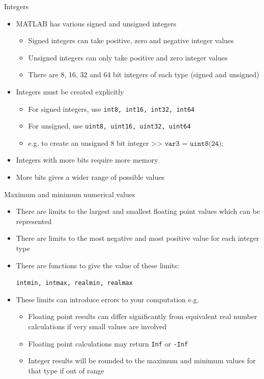 \documentclass{beamer}
\begin{document}
\begin{frame}{Integers}
	\begin{itemize}
		\item MATLAB has various signed and unsigned integers
		\begin{itemize}
			\item Signed integers can take positive, zero and negative integer values
			\item Unsigned integers can only take positive and zero integer values
			\item There are 8, 16, 32 and 64 bit integers of each type (signed and unsigned)
		\end{itemize}
		\item Integers must be created explicitly
		\begin{itemize}
			\item For signed integers, use \texttt{int8, int16, int32, int64}
			\item For unsigned, use \texttt{uint8, uint16, uint32, uint64}
			\item e.g. to create an unsigned 8 bit integer
				$\texttt{>> var3 = uint8(24);}$
		\end{itemize}
		
		\item Integers with more bits require more memory
		\item More bits gives a wider range of possible values
	\end{itemize}
\end{frame}

\begin{frame}{Maximum and minimum numerical values}
	\begin{itemize}
		\item There are limits to the largest and smallest floating point values which can be represented
		\item There are limits to the most negative and most positive value for each integer type
		\item There are functions to give the value of these limits:
		
		\texttt{intmin, intmax, realmin, realmax}
		\item These limits can introduce errors to your computation e.g.
		
		\begin{itemize}
			\item Floating point results can differ significantly from equivalent real number calculations if very small values are involved
			\item Floating point calculations may return \texttt{Inf} or \texttt{-Inf}
			\item Integer results will be rounded to the maximum and minimum values for that type if out of range
		\end{itemize}
	\end{itemize}
\end{frame}
\end{document}
